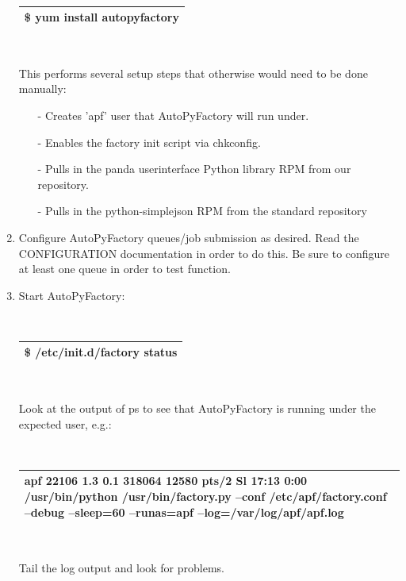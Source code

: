 \documentclass[a4paper]{jpconf}
\begin{document}
\begin{enumerate}

~

\begin{tabular}{|p{16cm}|}
   \hline
\$ yum install autopyfactory \\
   \hline
\end{tabular}

~

This performs several setup steps that otherwise would need to be done manually:
\begin{enumerate}
\item[-] Creates 'apf' user that AutoPyFactory will run under. 
\item[-] Enables the factory init script via chkconfig. 
\item[-] Pulls in the panda userinterface Python library RPM from our repository. 
\item[-] Pulls in the python-simplejson RPM from the standard repository
\end{enumerate}
\item Configure AutoPyFactory queues/job submission as desired. 
Read the CONFIGURATION documentation in order to do this. 
Be sure to configure at least one queue in order to test function.
\item Start AutoPyFactory:


~

\begin{tabular}{|p{16cm}|}
   \hline
\$ /etc/init.d/factory status \\
   \hline
\end{tabular}
~

Look at the output of ps to see that AutoPyFactory is running under the expected user, e.g.:


~

\begin{tabular}{|p{16cm}|}
   \hline
apf    22106 1.3 0.1 318064 12580 pts/2  Sl 17:13 0:00 /usr/bin/python /usr/bin/factory.py --conf /etc/apf/factory.conf --debug --sleep=60 --runas=apf --log=/var/log/apf/apf.log \\
   \hline
\end{tabular}
~

Tail the log output and look for problems.
\end{enumerate}
\end{document}
